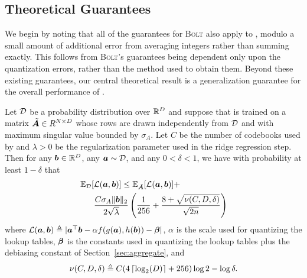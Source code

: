 \vspace{-1mm}
\subsection{Theoretical Guarantees} \label{sec:maddnessMainThm}
\vspace{-1.5mm}

We begin by noting that all of the guarantees for \textsc{Bolt}\text{} \cite{bolt} also apply to \ours, modulo a small amount of additional error from averaging integers rather than summing exactly. This follows from \textsc{Bolt}'s guarantees being dependent only upon the quantization errors, rather than the method used to obtain them.
Beyond these existing guarantees, our central theoretical result is a generalization guarantee for the overall performance of \ours.

\begin{theorem} \label{thm:maddness}
Let $\mathcal{D}$ be a probability distribution over $\mathbb{R}^D$ and suppose that \oursp is trained on a matrix $\tilde{\bm{A}} \in R^{N \times D}$ whose rows are drawn independently from $\mathcal{D}$ and with maximum singular value bounded by $\sigma_A$. Let $C$ be the number of codebooks used by \oursp and $\lambda > 0$ be the regularization parameter used in the ridge regression step. Then for any $\bm{b} \in \mathbb{R}^D$, any $\bm{a} \sim \mathcal{D}$, and any $0 < \delta < 1$, we have with probability at least $1 - \delta$ that
\begin{align}
    \begin{split}
    \mathbb{E}_{\mathcal{D}}[&\mathcal{L}(\bm{a}, \bm{b})] \le \mathbb{E}_{\tilde{\bm{A}}}[\mathcal{L}(\bm{a}, \bm{b})] + \\
    &\frac{C \sigma_A \lVert\bm{b}\rVert_2}{2 \sqrt{\lambda}} \left(
        \frac{1}{256} +
        \frac{
            8 +
            \sqrt{
                \nu(C, D, \delta)
            }
        }{\sqrt{2n}}
    \right)
    \end{split}
\end{align}
where $\mathcal{L}(\bm{a}, \bm{b}) \triangleq |\bm{a}^\top \bm{b} - \alpha f(g(\bm{a}), h(\bm{b})) - \bm{\beta}|$, $\alpha$ is the scale used for quantizing the lookup tables, $\bm{\beta}$ is the constants used in quantizing the lookup tables plus the debiasing constant of Section~\ref{sec:aggregate}, and
\begin{align}
    \nu(C, D, \delta) \triangleq C (4\left \lceil \log_2(D) \right \rceil + 256) \log{2} -\log{\delta}.
\end{align}
\end{theorem}

